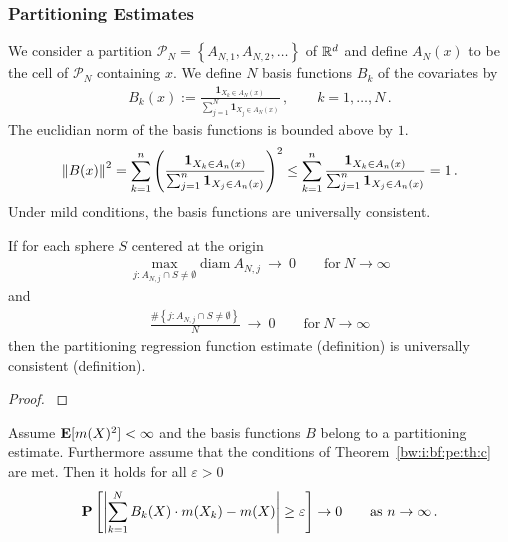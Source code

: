 \subsubsection*{Partitioning Estimates}
We consider a partition
$
  \mathcal{P}_N
  =
  \left\{ 
    A_{N,1}
    ,
    A_{N,2}
    ,
    \ldots
  \right\}
$
of $ \mathbb{R}^d $
and define
$ A_N(x) $ to be the cell of $ \mathcal{P}_N $ containing $x$.
We define $N$ basis functions $B_k$ of the covariates by
\begin{gather*}
  B_k(x)
  :=
  \frac{
  \mathbf{1}_{X_k \in A_N(x)}
  }{
  \sum_{j=1}^{N} 
  \mathbf{1}_{X_j \in A_N(x)}
  }
  \,,
  \qquad
  k=
  1,\ldots,N
  \,.
\end{gather*}
The euclidian norm of the basis functions is bounded above by $1$.
\begin{gather*}
  \left\lVert B(x)\right\rVert^2
  =
  \sum_{k=1}^{n} 
  \left( 
  \frac{
  \mathbf{1}_{X_k \in A_n(x)}
  }{
  \sum_{j=1}^{n} 
  \mathbf{1}_{X_j \in A_n(x)}
  }
  \right)
  ^2
  \le
  \sum_{k=1}^{n} 
  \frac{
  \mathbf{1}_{X_k \in A_n(x)}
  }{
  \sum_{j=1}^{n} 
  \mathbf{1}_{X_j \in A_n(x)}
  }
  =1
  \,.
\end{gather*}
Under mild conditions, the basis functions are universally consistent.
\begin{theorem}
  \label{bw:i:bf:pe:th:c}
  If for each sphere $S$ centered at the origin 
  \begin{gather}
    \max
    _
    {
      j\colon
      A_{N,j} 
      \cap
      S
      \neq
      \emptyset
    }
    \mathrm{diam}
    \ 
      A_{N,j} 
      \ 
      \to
      \ 
      0
      \qquad
      \text{for}\ 
      N\to \infty 
  \end{gather}
  and
  \begin{gather}
    \frac
    {
    \#
    \left\{  
      j\colon
      A_{N,j} 
      \cap
      S
      \neq
      \emptyset
    \right\}
    }
    {N}
      \ 
      \to
      \ 
      0
      \qquad
      \text{for}\ 
      N\to \infty 
  \end{gather}
  then the partitioning regression function estimate 
  (definition)
  is
  universally consistent (definition).
\end{theorem}
\begin{proof}
  \cite[Theorem~4.2.]{Gyorfi2002}
\end{proof}
\begin{corollary}
Assume
  $\mathbf{E}[m(X)^2]<\infty$
  and the basis functions $B$ belong to a partitioning estimate.
  Furthermore assume that the conditions of 
  Theorem~\ref{bw:i:bf:pe:th:c} are met.
Then it holds for all $\varepsilon>0$
\begin{gather}
  \P
  \left[ 
    \left| 
    \sum_{k=1}^{N} 
    B_k(X)
    \cdot
    m(X_k)
    -
    m(X)
    \right|
    \ge
    \varepsilon
  \right]
  \to
  0
  \qquad
  \text{as}
  \ 
  n\to \infty
  \,.
\end{gather}
\end{corollary}

